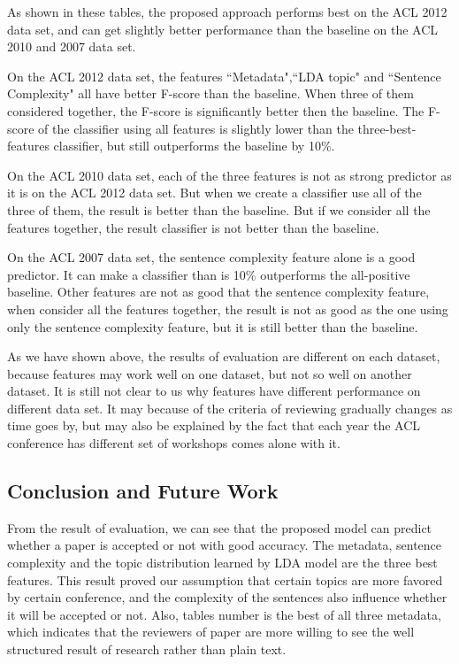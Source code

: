 \documentclass[11pt,letterpaper]{article}
\begin{document}
As shown in these tables,
the proposed approach performs best on the ACL 2012 data set,
and can get slightly better performance than the baseline on the ACL 2010 and 2007 data set.

On the ACL 2012 data set, the features ``Metadata",``LDA topic" and ``Sentence Complexity" 
all have better F-score than the baseline.
When three of them considered together, the F-score is significantly better then the baseline.
The F-score of the classifier using all features is slightly lower than the three-best-features classifier,
but still outperforms the baseline by 10\%.

On the ACL 2010 data set, each of the three features is not as strong predictor as it is on the ACL 2012 data set.
But when we create a classifier use all of the three of them, 
the result is better than the baseline. 
But if we consider all the features together, 
the result classifier is not better than the baseline.

On the ACL 2007 data set, the sentence complexity feature alone is a good predictor.
It can make a classifier than is 10\% outperforms the all-positive baseline.
Other features are not as good that the sentence complexity feature,
when consider all the features together, the result is not as good as the one using only the sentence complexity feature,
but it is still better than the baseline.

As we have shown above, the results of evaluation are different on each dataset, because features may work well on one dataset, 
but not so well on another dataset.
It is still not clear to us why features have different performance on different data set.
It may because of the criteria of reviewing gradually changes as time goes by, 
but may also be explained by the fact that each year the ACL conference has different set of workshops comes alone with it.


\subsection{Conclusion and Future Work} 
From the result of evaluation, we can see that the proposed model can predict whether a paper is accepted or not with good accuracy. 
The metadata, sentence complexity and the topic distribution learned by LDA model are the three best features.
This result proved our assumption that certain topics are more favored by certain conference,
and the complexity of the sentences also influence whether it will be accepted or not.
Also, tables number is the best of all three metadata, which indicates that the reviewers of paper are more willing to see the well structured result of research rather than plain text.
\end{document}
